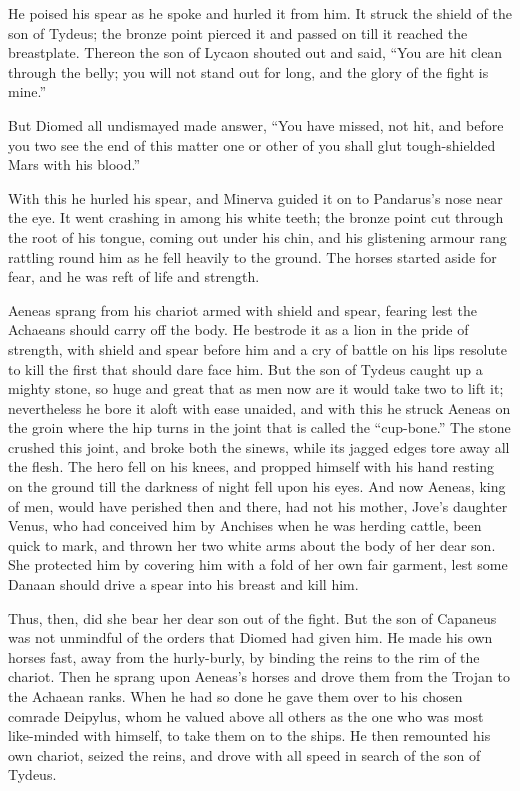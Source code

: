 He poised his spear as he spoke and hurled it from him. It struck the
shield of the son of Tydeus; the bronze point pierced it and passed on
till it reached the breastplate. Thereon the son of Lycaon shouted out and
said, “You are hit clean through the belly; you will not stand out for
long, and the glory of the fight is mine.”

But Diomed all undismayed made answer, “You have missed, not hit, and
before you two see the end of this matter one or other of you shall glut
tough-shielded Mars with his blood.”

With this he hurled his spear, and Minerva guided it on to Pandarus’s nose
near the eye. It went crashing in among his white teeth; the bronze point
cut through the root of his tongue, coming out under his chin, and his
glistening armour rang rattling round him as he fell heavily to the
ground. The horses started aside for fear, and he was reft of life and
strength.

Aeneas sprang from his chariot armed with shield and spear, fearing lest
the Achaeans should carry off the body. He bestrode it as a lion in the
pride of strength, with shield and spear before him and a cry of battle on
his lips resolute to kill the first that should dare face him. But the son
of Tydeus caught up a mighty stone, so huge and great that as men now are
it would take two to lift it; nevertheless he bore it aloft with ease
unaided, and with this he struck Aeneas on the groin where the hip turns
in the joint that is called the “cup-bone.” The stone crushed this joint,
and broke both the sinews, while its jagged edges tore away all the flesh.
The hero fell on his knees, and propped himself with his hand resting on
the ground till the darkness of night fell upon his eyes. And now Aeneas,
king of men, would have perished then and there, had not his mother,
Jove’s daughter Venus, who had conceived him by Anchises when he was
herding cattle, been quick to mark, and thrown her two white arms about
the body of her dear son. She protected him by covering him with a fold of
her own fair garment, lest some Danaan should drive a spear into his
breast and kill him.

Thus, then, did she bear her dear son out of the fight. But the son of
Capaneus was not unmindful of the orders that Diomed had given him. He
made his own horses fast, away from the hurly-burly, by binding the reins
to the rim of the chariot. Then he sprang upon Aeneas’s horses and drove
them from the Trojan to the Achaean ranks. When he had so done he gave
them over to his chosen comrade Deipylus, whom he valued above all others
as the one who was most like-minded with himself, to take them on to the
ships. He then remounted his own chariot, seized the reins, and drove with
all speed in search of the son of Tydeus.

